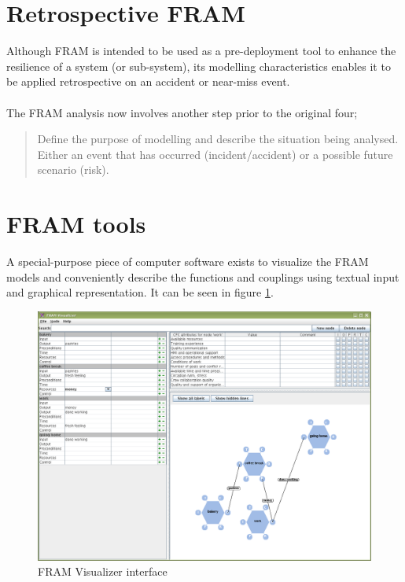 \documentclass[10pt,oneside]{book}                  %
\begin{document}
\section{Retrospective FRAM}
Although FRAM is intended to be used as a pre-deployment tool to enhance the resilience of a system (or sub-system), its modelling characteristics enables it to be applied retrospective on an accident or near-miss event.\\
\\
The FRAM analysis now involves another step prior to the original four;
\begin{quote}
Define the purpose of modelling and describe the situation being analysed. Either an event that has occurred (incident/accident) or a possible future scenario (risk).
\end{quote}

\section{FRAM tools}
A special-purpose piece of computer software exists to visualize the FRAM models and conveniently describe the functions and couplings using textual input and graphical representation. It can be seen in figure \ref{fig:fram_visualizer_interface}.



\begin{figure}
 \centering
   \includegraphics[width=320pt]{figures/framvisualizer1.png}
 \caption{FRAM Visualizer interface}
 \label{fig:fram_visualizer_interface}
\end{figure}
\end{document}
